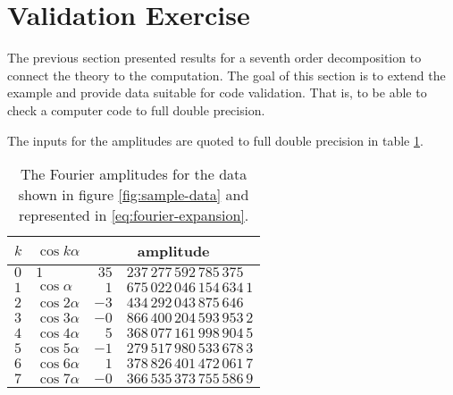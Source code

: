 % 

\section{Validation Exercise}
The previous section presented results for a seventh order decomposition to connect the theory to the computation. The goal of this section is to extend the example and provide data suitable for code validation. That is, to be able to check a computer code to full double precision.

The inputs for the amplitudes are quoted to full double precision in table \ref{tab:double-precision}. 
\begin{table}
	\begin{center}
		\begin{tabular}{llr@{.}l}
			$k$ & $\cos k\alpha$ & \multicolumn{2}{c}{amplitude}\\\hline
			$0$ & $1$             & $35$ & $237\,277\,592\,785\,375$ \\
			$1$ & $\cos \alpha$   & $1$  & $675\,022\,046\,154\,634\,1$ \\
			$2$ & $\cos 2\alpha$  & $-3$ & $434\,292\,043\,875\,646$ \\
			$3$ & $\cos 3\alpha$  & $-0$ & $866\,400\,204\,593\,953\,2$ \\
			$4$ & $\cos 4\alpha$  & $5$  & $368\,077\,161\,998\,904\,5$ \\
			$5$ & $\cos 5\alpha$  & $-1$ & $279\,517\,980\,533\,678\,3$ \\
			$6$ & $\cos 6\alpha$  & $1$  & $378\,826\,401\,472\,061\,7$ \\
			$7$ & $\cos 7\alpha$  & $-0$ & $366\,535\,373\,755\,586\,9$
		\end{tabular}
	\end{center}
\caption{The Fourier amplitudes for the data shown in figure \ref{fig:sample-data} and represented in \eqref{eq:fourier-expansion}.}
\label{tab:double-precision}
\end{table}

